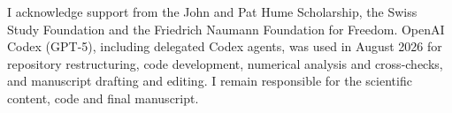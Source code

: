 \documentclass[11pt,a4paper]{article}
\begin{document}
\acknowledgments

I acknowledge support from the John and Pat Hume Scholarship, the
Swiss Study Foundation and the Friedrich Naumann Foundation for Freedom.
OpenAI Codex (GPT-5), including delegated Codex agents, was used in August 2026
for repository restructuring, code development, numerical analysis and
cross-checks, and manuscript drafting and editing.  I remain responsible for
the scientific content, code and final manuscript.



\end{document}
